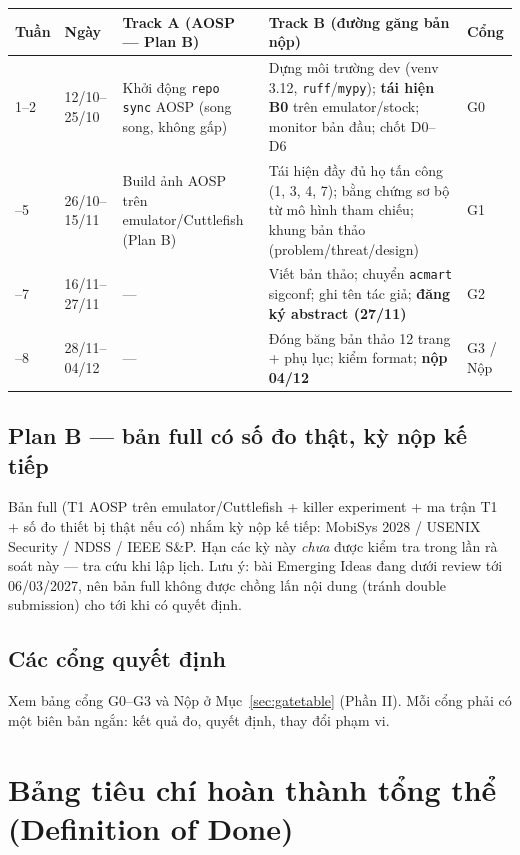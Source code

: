 \documentclass[11pt,a4paper]{article}
\newcommand{\code}[1]{\texttt{\small #1}}
\begin{document}
\begin{longtable}{@{}p{1.2cm}p{2.3cm}p{4.6cm}p{4.6cm}p{1.8cm}@{}}
\toprule
\textbf{Tuần} & \textbf{Ngày} & \textbf{Track A (AOSP --- Plan B)} & \textbf{Track B (đường găng bản nộp)} & \textbf{Cổng} \\
\midrule
\endhead
1--2 & 12/10--25/10 & Khởi động \code{repo sync} AOSP (song song, không gấp) & Dựng môi trường dev (venv 3.12, \code{ruff}/\code{mypy}); \textbf{tái hiện B0} trên emulator/stock; monitor bản đầu; chốt D0--D6 & G0 \\
\addlinespace
3--5 & 26/10--15/11 & Build ảnh AOSP trên emulator/Cuttlefish (Plan B) & Tái hiện đầy đủ họ tấn công (1, 3, 4, 7); bằng chứng sơ bộ từ mô hình tham chiếu; khung bản thảo (problem/threat/design) & G1 \\
\addlinespace
6--7 & 16/11--27/11 & --- & Viết bản thảo; chuyển \code{acmart} sigconf; ghi tên tác giả; \textbf{đăng ký abstract (27/11)} & G2 \\
\addlinespace
7--8 & 28/11--04/12 & --- & Đóng băng bản thảo 12 trang + phụ lục; kiểm format; \textbf{nộp 04/12} & G3 / Nộp \\
\bottomrule
\end{longtable}

\subsection{Plan B --- bản full có số đo thật, kỳ nộp kế tiếp}
\label{sec:planb}

Bản full (T1 AOSP trên emulator/Cuttlefish + killer experiment + ma trận T1 + số đo thiết bị thật nếu có) nhắm kỳ nộp kế tiếp: MobiSys 2028 / USENIX Security / NDSS / IEEE S\&P. Hạn các kỳ này \emph{chưa} được kiểm tra trong lần rà soát này — tra cứu khi lập lịch. Lưu ý: bài Emerging Ideas đang dưới review tới 06/03/2027, nên bản full không được chồng lấn nội dung (tránh double submission) cho tới khi có quyết định.

\subsection{Các cổng quyết định}
\label{sec:gates}

Xem bảng cổng G0--G3 và Nộp ở Mục~\ref{sec:gatetable} (Phần II). Mỗi cổng phải có một biên bản ngắn: kết quả đo, quyết định, thay đổi phạm vi.

\section{Bảng tiêu chí hoàn thành tổng thể (Definition of Done)}
\end{document}
